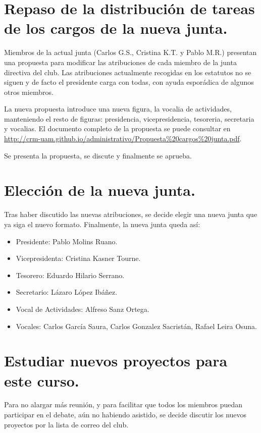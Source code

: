 \documentclass[a4paper]{article}
\begin{document}
\section{Repaso de la distribución de tareas de los cargos de la nueva junta.}

Miembros de la actual junta (Carlos G.S., Cristina K.T. y Pablo M.R.) presentan una propuesta para modificar las atribuciones de cada miembro de la junta directiva del club. Las atribuciones actualmente recogidas en los estatutos no se siguen y de facto el presidente carga con todas, con ayuda esporádica de algunos otros miembros. 

La nueva propuesta introduce una nueva figura, la vocalia de actividades, manteniendo el resto de figuras: presidencia, vicepresidencia, tesoreria, secretaria y vocalias. El documento completo de la propuesta se puede consultar en \url{http://crm-uam.github.io/administrativo/Propuesta\%20cargos\%20junta.pdf}.

Se presenta la propuesta, se discute y finalmente se aprueba.

\section{Elección de la nueva junta.}

Tras haber discutido las nuevas atribuciones, se decide elegir una nueva junta que ya siga el nuevo formato. Finalmente, la nueva junta queda así:

\begin{itemize}
\item Presidente: Pablo Molins Ruano.
\item Vicepresidenta: Cristina Kasner Tourne.
\item Tesorero: Eduardo Hilario Serrano.
\item Secretario: Lázaro López Ibáñez.
\item Vocal de Actividades: Alfreso Sanz Ortega.
\item Vocales: Carlos García Saura, Carlos Gonzalez Sacristán, Rafael Leira Osuna.
\end{itemize}

\section{Estudiar nuevos proyectos para este curso.}

Para no alargar más reunión, y para facilitar que todos los miembros puedan participar en el debate, aún no habiendo asistido, se decide discutir los nuevos proyectos por la lista de correo del club.
\end{document}
